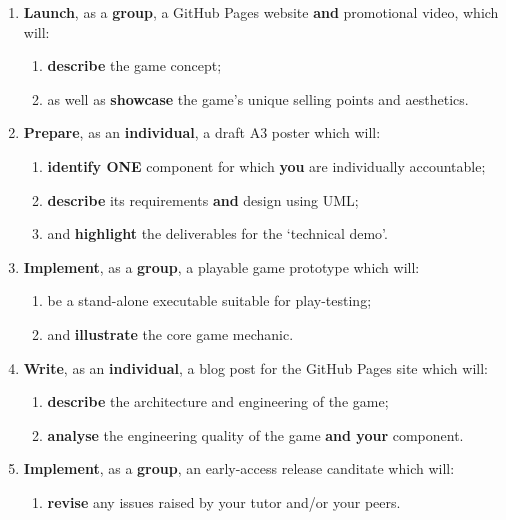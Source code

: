 \documentclass{../../fal_assignment}
\begin{document}
\begin{enumerate}[label=(\Alph*)]
    \item \textbf{Launch}, as a \textbf{group}, a GitHub Pages website \textbf{and} promotional video, which will:
    	\begin{enumerate}[label=\roman*.]
    		\item \textbf{describe} the game concept;
    		\item as well as \textbf{showcase} the game's unique selling points and aesthetics.
	\end{enumerate}
    \item \textbf{Prepare}, as an \textbf{individual}, a draft A3 poster which will:
    	\begin{enumerate}[label=\roman*.]
    	    	\item \textbf{identify ONE} component for which \textbf{you} are individually accountable;
    		\item \textbf{describe} its requirements \textbf{and} design using UML;
    		\item and \textbf{highlight} the deliverables for the `technical demo'.
	\end{enumerate}
    \item \textbf{Implement}, as a \textbf{group}, a playable game prototype which will:
    	\begin{enumerate}[label=\roman*.]
    		\item be a stand-alone executable suitable for play-testing;
    		\item and \textbf{illustrate} the core game mechanic.
	\end{enumerate}
    \item \textbf{Write}, as an \textbf{individual}, a blog post for the GitHub Pages site which will:
    	\begin{enumerate}[label=\roman*.]
			\item \textbf{describe} the architecture and engineering of the game;
    		\item \textbf{analyse} the engineering quality of the game \textbf{and your} component.
	\end{enumerate}	
    \item \textbf{Implement}, as a \textbf{group}, an early-access release canditate which will:
    	\begin{enumerate}[label=\roman*.]
    		\item \textbf{revise} any issues raised by your tutor and/or your peers.
	\end{enumerate}

\end{enumerate}
\end{document}
